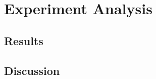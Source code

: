 
\chapter{Experiment Analysis}
\label{ch:analysis}
\vspace{2em}

\section{Results}
\section{Discussion}
